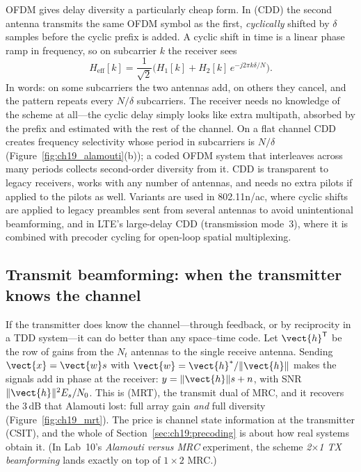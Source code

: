OFDM gives delay diversity a particularly cheap form. In  (CDD) the
second antenna transmits the same OFDM symbol as the first, \emph{cyclically} shifted by $\delta$
samples before the cyclic prefix is added. A cyclic shift in time is a linear phase ramp in
frequency, so on subcarrier $k$ the receiver sees
\begin{equation}
H_{\text{eff}}[k]=\frac{1}{\sqrt2}\Big(H_1[k]+H_2[k]\,e^{-j2\pi k\delta/N}\Big).
\end{equation}
In words: on some subcarriers the two antennas add, on others they cancel, and the pattern repeats
every $N/\delta$ subcarriers. The receiver needs no knowledge of the scheme at all---the cyclic
delay simply looks like extra multipath, absorbed by the prefix and estimated with the rest of the
channel. On a flat channel CDD creates frequency selectivity whose period in subcarriers is
$N/\delta$ (Figure~\ref{fig:ch19_alamouti}(b)); a coded OFDM system that interleaves across many
periods collects second-order diversity from it. CDD is transparent to legacy receivers, works
with any number of antennas, and needs no extra pilots if applied to the pilots as well. Variants
are used in 802.11n/ac, where cyclic shifts are applied to legacy preambles sent from several
antennas to avoid unintentional beamforming, and in LTE's large-delay CDD (transmission mode~3),
where it is combined with precoder cycling for open-loop spatial multiplexing.

\subsection{Transmit beamforming: when the transmitter knows the channel}

If the transmitter does know the channel---through feedback, or by reciprocity in a TDD
system---it can do better than any space--time code. Let $\vect{h}^{\mathsf T}$ be the row of gains
from the $N_t$ antennas to the single receive antenna. Sending $\vect{x}=\vect{w}s$ with
$\vect{w}=\vect{h}^*/\|\vect{h}\|$ makes the signals add in phase at the receiver:
$y=\|\vect{h}\|s+n$, with SNR $\|\vect{h}\|^2E_s/N_0$. This is 
(MRT), the transmit dual of MRC, and it recovers the 3\,dB that Alamouti lost: full array gain
\emph{and} full diversity (Figure~\ref{fig:ch19_mrt}). The price is channel state information at the transmitter (CSIT), and
the whole of Section~\ref{sec:ch19:precoding} is about how real systems obtain it. (In Lab~10's
\emph{Alamouti versus MRC} experiment, the scheme \emph{2$\times$1 TX beamforming} lands exactly on
top of $1\times2$ MRC.)

